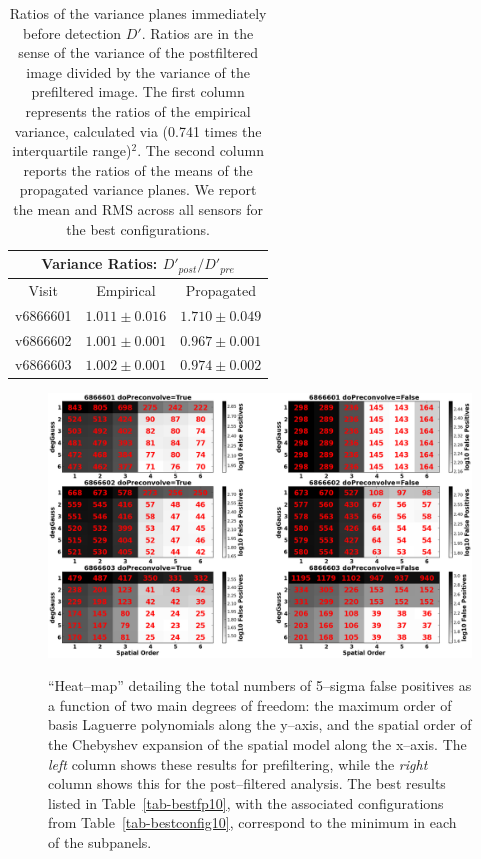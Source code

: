 \documentclass[prd, nofootinbib, floatfix, 11pt,tightenlines,times]{article}
\begin{document}
\begin{table}
\centering
\begin{tabular}{ccc}
\hline
\multicolumn{3}{|c|}{Variance Ratios: $D'_{post} / D'_{pre}$} \\
\hline
Visit    & Empirical & Propagated \\
\hline
v6866601 & $1.011 \pm 0.016$    & $1.710 \pm 0.049$    \\
v6866602 & $1.001 \pm 0.001$    & $0.967 \pm 0.001$    \\
v6866603 & $1.002 \pm 0.001$    & $0.974 \pm 0.002$    \\
\end{tabular}
\caption{Ratios of the variance planes immediately before detection
  $D'$.  Ratios are in the sense of the variance of the postfiltered
  image divided by the variance of the prefiltered image.  The first
  column represents the ratios of the empirical variance, calculated
  via (0.741 times the interquartile range)$^2$.  The second column
  reports the ratios of the means of the propagated variance planes.
  We report the mean and RMS across all sensors for the best
  configurations.}
\label{tab-variance2}
\end{table}


\clearpage

\begin{figure}
\includegraphics[width=1.0\textwidth]{figures/heatmap10.eps} \\
\caption{``Heat--map'' detailing the total numbers of 5--sigma false
  positives as a function of two main degrees of freedom: the maximum
  order of basis Laguerre polynomials along the y--axis, and the
  spatial order of the Chebyshev expansion of the spatial model along
  the x--axis.  The {\it left} column shows these results for
  prefiltering, while the {\it right} column shows this for the
  post--filtered analysis.  The best results listed in
  Table~\ref{tab-bestfp10}, with the associated configurations from
  Table~\ref{tab-bestconfig10}, correspond to the minimum in each of the
  subpanels.  }
\label{fp_heatmap}
\end{figure}
\end{document}
